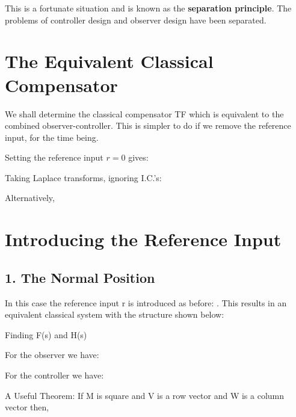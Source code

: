 This is a fortunate situation and is known as the \textbf{separation principle}. The problems of controller design and observer design have been separated.
 


\section*{The Equivalent Classical Compensator} %
\label{sec:the_equivalent_classical_compensator}

We shall determine the classical compensator TF which is equivalent to the combined observer-controller. This is simpler to do if we remove the reference input, for the time being.

Setting the reference input $r = 0$  gives:

 
Taking Laplace transforms, ignoring I.C.’s:

 
 







 
Alternatively,




 
\section{Introducing the Reference Input} %
\label{sec:introducing_the_reference_input}

\subsection{1. The Normal Position} %
\label{sub:1_the_normal_position}

In this case the reference input  r  is introduced as before:       .  This results in an equivalent classical system with the structure shown below:






Finding F(s) and H(s)

For the observer we have:

 
 
For the controller we have:
 

A Useful Theorem:
If M is square and V is a row vector and W is a column vector then,

